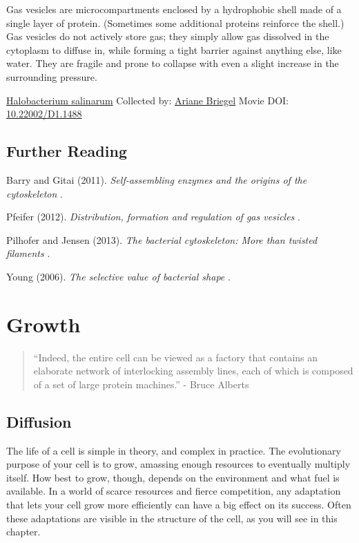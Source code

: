 \documentclass[]{tufte-book}
\begin{document}
Gas vesicles are microcompartments enclosed by a hydrophobic shell made of a single layer of protein. (Sometimes some additional proteins reinforce the shell.) Gas vesicles do not actively store gas; they simply allow gas dissolved in the cytoplasm to diffuse in, while forming a tight barrier against anything else, like water. They are fragile and prone to collapse with even a slight increase in the surrounding pressure.



\hypertarget{htmlwidget-903ef381c050aef41f21}{}

\label{fig:3-7a}\protect\hyperlink{tree}{Halobacterium salinarum} Collected by: \protect\hyperlink{ariane_briegel}{Ariane Briegel} Movie DOI: \href{https://doi.org/10.22002/D1.1488}{10.22002/D1.1488}

\hypertarget{further-reading-2}{%
\section{Further Reading}\label{further-reading-2}}

Barry and Gitai (2011). \emph{Self-assembling enzymes and the origins of the cytoskeleton} \citep{barry2011}.

Pfeifer (2012). \emph{Distribution, formation and regulation of gas vesicles} \citep{pfeifer2012}.

Pilhofer and Jensen (2013). \emph{The bacterial cytoskeleton: More than twisted filaments} \citep{pilhofer2013}.

Young (2006). \emph{The selective value of bacterial shape} \citep{young2006}.

\hypertarget{growth}{%
\chapter{Growth}\label{growth}}

\begin{quote}
``Indeed, the entire cell can be viewed as a factory that contains an elaborate network of interlocking assembly lines, each of which is composed of a set of large protein machines.''
- Bruce Alberts \citep{alberts1998}
\end{quote}

\hypertarget{diffusion}{%
\section{Diffusion}\label{diffusion}}

The life of a cell is simple in theory, and complex in practice. The evolutionary purpose of your cell is to grow, amassing enough resources to eventually multiply itself. How best to grow, though, depends on the environment and what fuel is available. In a world of scarce resources and fierce competition, any adaptation that lets your cell grow more efficiently can have a big effect on its success. Often these adaptations are visible in the structure of the cell, as you will see in this chapter.
\end{document}
